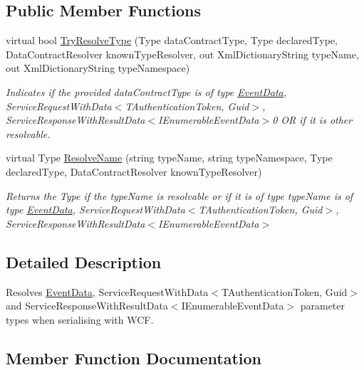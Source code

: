 \subsection*{Public Member Functions}
\begin{DoxyCompactItemize}
\item 
virtual bool \hyperlink{classCqrs_1_1Events_1_1EventDataResolver_a62be7cd15bb38f3a4054a62e787c473d_a62be7cd15bb38f3a4054a62e787c473d}{Try\+Resolve\+Type} (Type data\+Contract\+Type, Type declared\+Type, Data\+Contract\+Resolver known\+Type\+Resolver, out Xml\+Dictionary\+String type\+Name, out Xml\+Dictionary\+String type\+Namespace)
\begin{DoxyCompactList}\small\item\em Indicates if the provided {\itshape data\+Contract\+Type}  is of type \hyperlink{classCqrs_1_1Events_1_1EventData}{Event\+Data}, Service\+Request\+With\+Data$<$\+T\+Authentication\+Token, Guid$>$, Service\+Response\+With\+Result\+Data$<$\+I\+Enumerable\+Event\+Data$>$0 OR if it is other resolvable. \end{DoxyCompactList}\item 
virtual Type \hyperlink{classCqrs_1_1Events_1_1EventDataResolver_ade34415acd009dd3f9f3a43169da43e9_ade34415acd009dd3f9f3a43169da43e9}{Resolve\+Name} (string type\+Name, string type\+Namespace, Type declared\+Type, Data\+Contract\+Resolver known\+Type\+Resolver)
\begin{DoxyCompactList}\small\item\em Returns the Type if the {\itshape type\+Name}  is resolvable or if it is of type {\itshape type\+Name}  is of type \hyperlink{classCqrs_1_1Events_1_1EventData}{Event\+Data}, Service\+Request\+With\+Data$<$\+T\+Authentication\+Token, Guid$>$, Service\+Response\+With\+Result\+Data$<$\+I\+Enumerable\+Event\+Data$>$ \end{DoxyCompactList}\end{DoxyCompactItemize}


\subsection{Detailed Description}
Resolves \hyperlink{classCqrs_1_1Events_1_1EventData}{Event\+Data}, Service\+Request\+With\+Data$<$\+T\+Authentication\+Token, Guid$>$ and Service\+Response\+With\+Result\+Data$<$\+I\+Enumerable\+Event\+Data$>$ parameter types when serialising with W\+CF. 



\subsection{Member Function Documentation}
\mbox{\label{classCqrs_1_1Events_1_1EventDataResolver_ade34415acd009dd3f9f3a43169da43e9_ade34415acd009dd3f9f3a43169da43e9}} 
